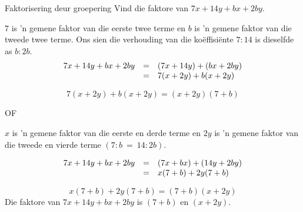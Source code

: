 \begin{wex}{Faktorisering deur groepering }{Vind die faktore van $7x+14y+bx+2by$.}
{


 $7$ is ’n gemene faktor van die eerste twee terme en $b$ is ’n gemene faktor van die tweede twee terme. Ons sien die verhouding van die ko\"effisi\"ente $7:14$ is dieselfde as $b:2b$.
\begin{equation*}
 \begin{array}{ccl}

7x+14y+bx+2by&=& (7x+14y)+(bx+2by)  \hfill\\ 
&=&7(x+2y)+b(x+2y) \hfill 
\end{array}
\end{equation*}


\begin{equation*}
7(x+2y)+b(x+2y)=(x+2y)(7+b)
\end{equation*}
% 
\par 
OF
% 
% 
% 

\setcounter{stepcounter}{1}
$x$ is 'n gemene faktor van die eerste en derde terme en $2y$ is 'n gemene faktor van die tweede en vierde terme $(7:b~=~14:2b)$.\par 
{}

\begin{equation*}
 \begin{array}{ccl}

7x+14y+bx+2by&=& (7x+bx)+(14y+2by)  \hfill\\ 
&=&x(7+b)+2y(7+b) \hfill 
\end{array}
\end{equation*}


\begin{equation*}
x(7+b)+2y(7+b) = (7+b)(x+2y)
\end{equation*}
Die faktore van $7x+14y+bx+2by$ is $(7+b)$ en $(x+2y)$.
}
\end{wex}


